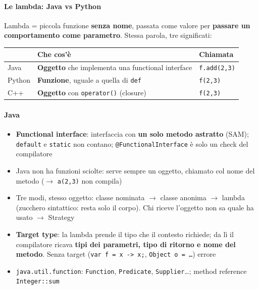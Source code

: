 \documentclass[12pt]{extarticle}
\begin{document}
\paragraph{Le lambda: Java vs Python} Lambda = piccola funzione \textbf{senza nome}, passata come valore per \textbf{passare un comportamento come parametro}. Stessa parola, tre significati:
\begin{center}
\small
\begin{tabular}{p{1.8cm}p{5.6cm}p{5.6cm}}
    \toprule
    & \textbf{Che cos'è} & \textbf{Chiamata} \\
    \midrule
    Java & \textbf{Oggetto} che implementa una functional interface & \texttt{f.add(2,3)} \\
    \addlinespace
    Python & \textbf{Funzione}, uguale a quella di \texttt{def} & \texttt{f(2,3)} \\
    \addlinespace
    C++ & \textbf{Oggetto} con \texttt{operator()} (closure) & \texttt{f(2,3)} \\
    \bottomrule
\end{tabular}
\end{center}

\paragraph{Java}
\begin{itemize}
    \item \textbf{Functional interface}: interfaccia con \textbf{un solo metodo astratto} (SAM); \texttt{default} e \texttt{static} non contano; \texttt{@FunctionalInterface} è solo un check del compilatore
    \item Java non ha funzioni sciolte: serve sempre un oggetto, chiamato col nome del metodo ($\rightarrow$ \texttt{a(2,3)} non compila)
    \item Tre modi, stesso oggetto: classe nominata $\rightarrow$ classe anonima $\rightarrow$ lambda (zucchero sintattico: resta solo il corpo). Chi riceve l'oggetto non sa quale ha usato $\rightarrow$ Strategy
    \item \textbf{Target type}: la lambda prende il tipo che il contesto richiede; da lì il compilatore ricava \textbf{tipi dei parametri, tipo di ritorno e nome del metodo}. Senza target (\texttt{var f = x -> x;}, \texttt{Object o = \dots}) errore
    \item \texttt{java.util.function}: \texttt{Function}, \texttt{Predicate}, \texttt{Supplier}\dots; method reference \texttt{Integer::sum}
\end{itemize}
\end{document}
